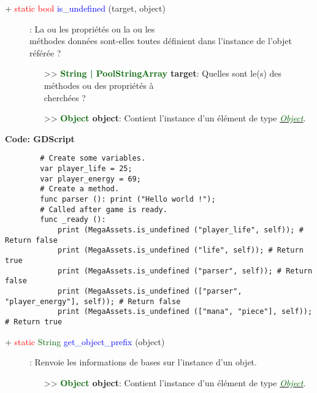 \documentclass[a4paper, 11pt]{article}
\begin{document}
	\begin{description}
		\item [+ \textcolor{red}{static bool} \textcolor{blue}{is\_undefined} (target, object)]: La ou les 
		propriétés ou la ou les \\méthodes données sont-elles toutes définient dans l'instance de l'objet
		référée ?
		\begin{itemize}
			\item[>> \textbf{\textcolor{darkgreen}{String | PoolStringArray} target}:] Quelles sont le(s) 
			des méthodes ou des propriétés à \\cherchées ?
			\item[>> \textbf{\textcolor{darkgreen}{Object} object}:] Contient l'instance d'un élément de 
			type \href{https://docs.godotengine.org/fr/stable/classes/class_object.html}
			{\textit{\textcolor{darkgreen}{Object}}}.\\
		\end{itemize}
	\end{description}
	\textbf{Code: GDScript}
	\begin{lstlisting}
		# Create some variables.
		var player_life = 25;
		var player_energy = 69;
		# Create a method.
		func parser (): print ("Hello world !");
		# Called after game is ready.
		func _ready ():
			print (MegaAssets.is_undefined ("player_life", self)); # Return false
			print (MegaAssets.is_undefined ("life", self)); # Return true
			print (MegaAssets.is_undefined ("parser", self)); # Return false
			print (MegaAssets.is_undefined (["parser", "player_energy"], self)); # Return false
			print (MegaAssets.is_undefined (["mana", "piece"], self)); # Return true
	\end{lstlisting}
	\begin{description}
		\item [+ \textcolor{red}{static} \textcolor{darkgreen}{String} \textcolor{blue}{get\_object\_prefix} 
		(object)]: Renvoie les informations de bases sur l'instance d'un objet.
		\begin{itemize}
			\item[>> \textbf{\textcolor{darkgreen}{Object} object}:] Contient l'instance d'un élément de
			type \href{https://docs.godotengine.org/fr/stable/classes/class_object.html}
			{\textit{\textcolor{darkgreen}{Object}}}.\\
		\end{itemize}
	\end{description}
\end{document}
